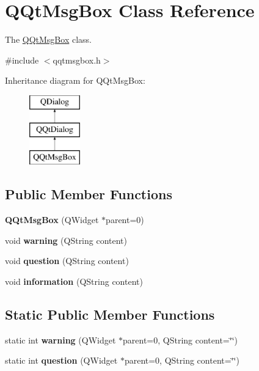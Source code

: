 \hypertarget{class_q_qt_msg_box}{}\section{Q\+Qt\+Msg\+Box Class Reference}
\label{class_q_qt_msg_box}


The \mbox{\hyperlink{class_q_qt_msg_box}{Q\+Qt\+Msg\+Box}} class.  




{\ttfamily \#include $<$qqtmsgbox.\+h$>$}

Inheritance diagram for Q\+Qt\+Msg\+Box\+:\begin{figure}[H]
\begin{center}
\leavevmode
\includegraphics[height=3.000000cm]{class_q_qt_msg_box}
\end{center}
\end{figure}
\subsection*{Public Member Functions}
\begin{DoxyCompactItemize}
\item 
\mbox{\label{class_q_qt_msg_box_a453a53fc857dc17f14c1d41bdcdc1582}} 
{\bfseries Q\+Qt\+Msg\+Box} (Q\+Widget $\ast$parent=0)
\item 
\mbox{\label{class_q_qt_msg_box_a6f4f6053a2c5ad0940ea814c5d4ee032}} 
void {\bfseries warning} (Q\+String content)
\item 
\mbox{\label{class_q_qt_msg_box_af285ce5eb76795d5f90f2521795dc519}} 
void {\bfseries question} (Q\+String content)
\item 
\mbox{\label{class_q_qt_msg_box_af818f464379f7491b8f9745ffd38b6d7}} 
void {\bfseries information} (Q\+String content)
\end{DoxyCompactItemize}
\subsection*{Static Public Member Functions}
\begin{DoxyCompactItemize}
\item 
\mbox{\label{class_q_qt_msg_box_a8e026a430afae2e97422397ac7f6af94}} 
static int {\bfseries warning} (Q\+Widget $\ast$parent=0, Q\+String content=\char`\"{}\char`\"{})
\item 
\mbox{\label{class_q_qt_msg_box_ac37bc88d5bacfb14b41df974ff0da438}} 
static int {\bfseries question} (Q\+Widget $\ast$parent=0, Q\+String content=\char`\"{}\char`\"{})
\end{DoxyCompactItemize}
